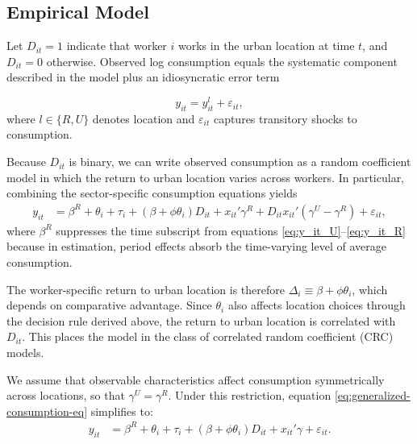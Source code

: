 \documentclass[12pt]{article}
\begin{document}
\subsection{Empirical Model}\label{subsec:empirical-model}

Let $D_{i t}=1$ indicate that worker $i$ works in the urban location at time $t$, and $D_{i t}=0$ otherwise.
Observed log consumption equals the systematic component described in the model plus an idiosyncratic error term

\begin{equation}
    y_{i t} = y_{i t}^l + \varepsilon_{i t},
\end{equation}
where $l \in \{R,U\}$ denotes location and $\varepsilon_{i t}$ captures transitory shocks to consumption.

Because $D_{it}$ is binary, we can write observed consumption as a random coefficient model in which the return to urban location varies across workers.
In particular, combining the sector-specific consumption equations yields
\begin{align}
    y_{it}&=\beta^R+\theta_i + \tau_i +(\beta+\phi \theta_i)D_{it}+  x_{it}'\gamma^R + D_{it}x_{it}'(\gamma^U-\gamma^R) + \varepsilon_{it},\label{eq:generalized-consumption-eq}
\end{align}
\noindent where $\beta^R$ suppresses the time subscript from equations \eqref{eq:y_it_U}--\eqref{eq:y_it_R} because in estimation, period effects absorb the time-varying level of average consumption.

The worker-specific return to urban location is therefore $\Delta_i \equiv \beta + \phi\theta_{i}$, which depends on comparative advantage.
Since $\theta_{i}$ also affects location choices through the decision rule derived above, the return to urban location is correlated with $D_{it}$.
This places the model in the class of correlated random coefficient (CRC) models.



We assume that observable characteristics affect consumption symmetrically across locations, so that $\gamma^U=\gamma^R$.
Under this restriction, equation \eqref{eq:generalized-consumption-eq} simplifies to: 
\begin{align}
    y_{it}&=\beta^R+\theta_i + \tau_i +(\beta+\phi \theta_i)D_{it}+  x_{it}'\gamma + \varepsilon_{it}.\tag{10$'$}\label{eq:generalized-consumption-eq-simple}
\end{align}
\end{document}
